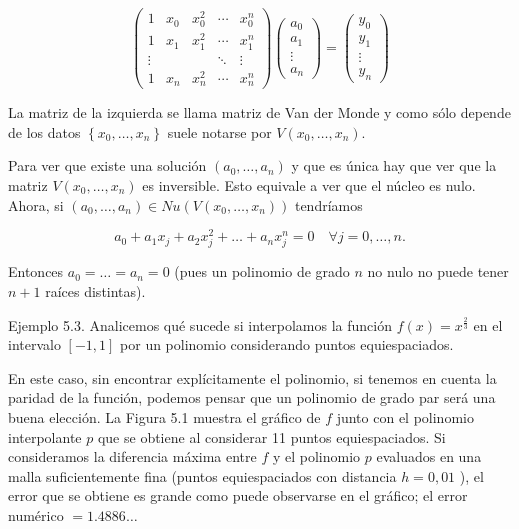 \documentclass[10pt]{article}
\begin{document}
$$
\left(\begin{array}{ccccc}
1 & x_{0} & x_{0}^{2} & \cdots & x_{0}^{n} \\
1 & x_{1} & x_{1}^{2} & \cdots & x_{1}^{n} \\
\vdots & & & \ddots & \vdots \\
1 & x_{n} & x_{n}^{2} & \cdots & x_{n}^{n}
\end{array}\right)\left(\begin{array}{c}
a_{0} \\
a_{1} \\
\vdots \\
a_{n}
\end{array}\right)=\left(\begin{array}{c}
y_{0} \\
y_{1} \\
\vdots \\
y_{n}
\end{array}\right)
$$

La matriz de la izquierda se llama matriz de Van der Monde y como sólo depende de los datos $\left\{x_{0}, \ldots, x_{n}\right\}$ suele notarse por $V\left(x_{0}, \ldots, x_{n}\right)$.

Para ver que existe una solución $\left(a_{0}, \ldots, a_{n}\right)$ y que es única hay que ver que la matriz $V\left(x_{0}, \ldots, x_{n}\right)$ es inversible. Esto equivale a ver que el núcleo es nulo. Ahora, si $\left(a_{0}, \ldots, a_{n}\right) \in N u\left(V\left(x_{0}, \ldots, x_{n}\right)\right)$ tendríamos

$$
a_{0}+a_{1} x_{j}+a_{2} x_{j}^{2}+\ldots+a_{n} x_{j}^{n}=0 \quad \forall j=0, \ldots, n .
$$

Entonces $a_{0}=\ldots=a_{n}=0$ (pues un polinomio de grado $n$ no nulo no puede tener $n+1$ raíces distintas).

Ejemplo 5.3. Analicemos qué sucede si interpolamos la función $f(x)=x^{\frac{2}{3}}$ en el intervalo $[-1,1]$ por un polinomio considerando puntos equiespaciados.

En este caso, sin encontrar explícitamente el polinomio, si tenemos en cuenta la paridad de la función, podemos pensar que un polinomio de grado par será una buena elección. La Figura 5.1 muestra el gráfico de $f$ junto con el polinomio interpolante $p$ que se obtiene al considerar 11 puntos equiespaciados. Si consideramos la diferencia máxima entre $f$ y el polinomio $p$ evaluados en una malla suficientemente fina (puntos equiespaciados con distancia $h=0,01$ ), el error que se obtiene es grande como puede observarse en el gráfico; el error numérico $=1.4886 \ldots$
\end{document}

